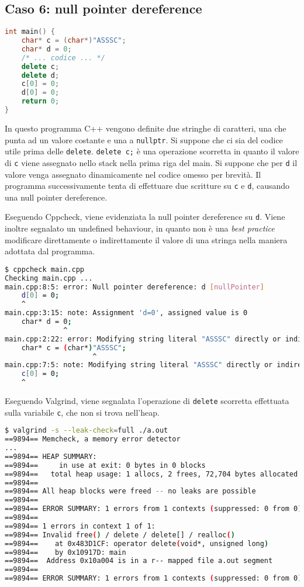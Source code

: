 \documentclass{article}
\begin{document}
\newpage
\subsection{Caso 6: null pointer dereference}
\label{sec:caso6}

\begin{lstlisting}[language=c++]
int main() {
    char* c = (char*)"ASSSC";
    char* d = 0;
    /* ... codice ... */
    delete c;
    delete d;
    c[0] = 0;
    d[0] = 0;
    return 0;
}
\end{lstlisting}

In questo programma C++ vengono definite due stringhe di caratteri, una che
punta ad un valore costante e una a \texttt{nullptr}. Si suppone che ci sia del
codice utile prima delle \texttt{delete}. \texttt{delete c;} è una operazione
scorretta in quanto il valore di \texttt{c} viene assegnato nello stack nella
prima riga del main. Si suppone che per \texttt{d} il valore venga assegnato
dinamicamente nel codice omesso per brevità. Il programma successivamente tenta
di effettuare due scritture su \texttt{c} e \texttt{d}, causando una null
pointer dereference. 

Eseguendo Cppcheck, viene evidenziata la null pointer dereference su \texttt{d}.
Viene inoltre segnalato un undefined behaviour, in quanto non è una \emph{best
practice} modificare direttamente o indirettamente il valore di una stringa
nella maniera adottata dal programma.

\begin{lstlisting}[language=bash]
$ cppcheck main.cpp 
Checking main.cpp ...
main.cpp:8:5: error: Null pointer dereference: d [nullPointer]
    d[0] = 0;
    ^
main.cpp:3:15: note: Assignment 'd=0', assigned value is 0
    char* d = 0;
              ^
main.cpp:2:22: error: Modifying string literal "ASSSC" directly or indirectly is undefined behaviour. [stringLiteralWrite]
    char* c = (char*)"ASSSC";
                     ^
main.cpp:7:5: note: Modifying string literal "ASSSC" directly or indirectly is undefined behaviour.
    c[0] = 0;
    ^
\end{lstlisting}

Eseguendo Valgrind, viene segnalata l'operazione di \texttt{delete} scorretta
effettuata sulla variabile \texttt{c}, che non si trova nell'heap.

\begin{lstlisting}[language=bash]
$ valgrind -s --leak-check=full ./a.out 
==9894== Memcheck, a memory error detector
...
==9894== HEAP SUMMARY:
==9894==     in use at exit: 0 bytes in 0 blocks
==9894==   total heap usage: 1 allocs, 2 frees, 72,704 bytes allocated
==9894== 
==9894== All heap blocks were freed -- no leaks are possible
==9894== 
==9894== ERROR SUMMARY: 1 errors from 1 contexts (suppressed: 0 from 0)
==9894== 
==9894== 1 errors in context 1 of 1:
==9894== Invalid free() / delete / delete[] / realloc()
==9894==    at 0x483D1CF: operator delete(void*, unsigned long) 
==9894==    by 0x10917D: main 
==9894==  Address 0x10a004 is in a r-- mapped file a.out segment
==9894== 
==9894== ERROR SUMMARY: 1 errors from 1 contexts (suppressed: 0 from 0)
\end{lstlisting}
\end{document}
